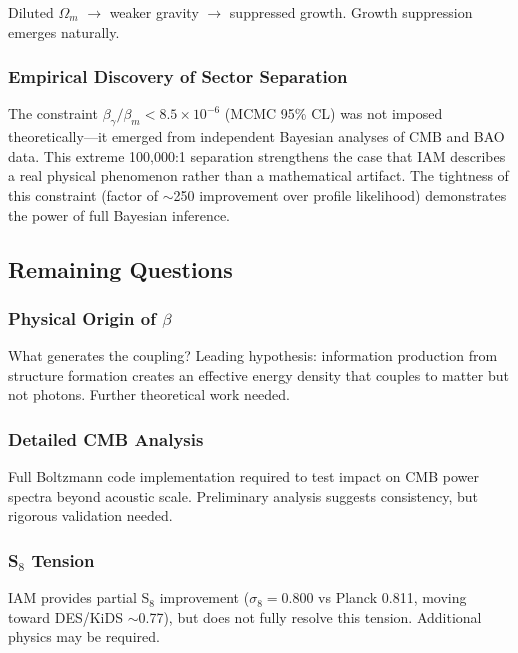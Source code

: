 \documentclass[11pt,letterpaper]{article}
\begin{document}
\noindent Diluted $\Omega_m$ $\rightarrow$ weaker gravity $\rightarrow$ suppressed growth. Growth suppression emerges naturally.

\subsubsection{Empirical Discovery of Sector Separation}

The constraint $\beta_\gamma/\beta_m < 8.5 \times 10^{-6}$ (MCMC 95\% CL) was not imposed theoretically—it emerged from independent Bayesian analyses of CMB and BAO data. This extreme 100,000:1 separation strengthens the case that IAM describes a real physical phenomenon rather than a mathematical artifact. The tightness of this constraint (factor of $\sim$250 improvement over profile likelihood) demonstrates the power of full Bayesian inference.

\subsection{Remaining Questions}

\subsubsection{Physical Origin of $\beta$}

What generates the coupling? Leading hypothesis: information production from structure formation creates an effective energy density that couples to matter but not photons. Further theoretical work needed.

\subsubsection{Detailed CMB Analysis}

Full Boltzmann code implementation required to test impact on CMB power spectra beyond acoustic scale. Preliminary analysis suggests consistency, but rigorous validation needed.

\subsubsection{S$_8$ Tension}

IAM provides partial S$_8$ improvement ($\sigma_8 = 0.800$ vs Planck 0.811, moving toward DES/KiDS $\sim$0.77), but does not fully resolve this tension. Additional physics may be required.

\end{document}
